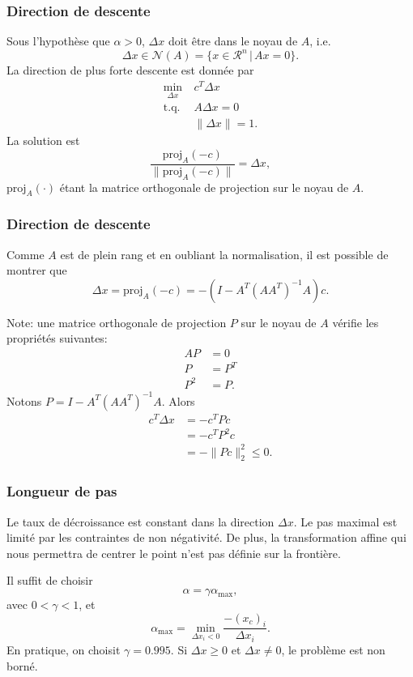 \documentclass[usepdftitle=false]{beamer}
\def\cN{\mathcal{N}}
\def\RR {\mathcal{R}}
\begin{document}
\begin{frame}
\frametitle{Direction de descente}

Sous l'hypothèse que $\alpha > 0$, $\Delta x$ doit être dans le noyau de $A$, i.e.
$$
\Delta x \in \cN(A) = \{x \in \RR^n \,|\, Ax = 0 \}.
$$
La direction de plus forte descente est donnée par
\begin{align*}
\min_{\Delta x}\ & c^T\Delta x \\
\mbox{t.q. } & A \Delta x = 0 \\
& \| \Delta x \| = 1.
\end{align*}
La solution est
$$
\frac{\text{proj}_A(-c)}{\| \text{proj}_A (-c) \|} = \Delta x,
$$
$\text{proj}_A(\cdot)$ étant la matrice orthogonale de projection sur le
noyau de $A$.

\end{frame}

\begin{frame}
\frametitle{Direction de descente}

Comme $A$ est de plein rang et en oubliant la normalisation, il est possible de montrer que
$$
\Delta x = \text{proj}_A(-c) = -(I - A^T(AA^T)^{-1}A)c.
$$

\mbox{}

Note: une matrice orthogonale de projection $P$ sur le noyau de $A$ vérifie les propriétés suivantes:
\begin{align*}
AP &= 0 \\
P &= P^T \\
P^2 &= P.
\end{align*}
Notons $P = I - A^T(AA^T)^{-1}A$. Alors
\begin{align*}
c^T \Delta x &= -c^T P c \\
& = -c^T P^2 c \\
& = - \| Pc \|^2_2 \leq 0.
\end{align*}

\end{frame}

\begin{frame}
\frametitle{Longueur de pas}

Le taux de décroissance est constant dans la direction $\Delta x$.
Le pas maximal est limité par les contraintes de non négativité.
De plus, la transformation affine qui nous permettra de centrer le point n'est pas définie sur la frontière.

\mbox{}

Il suffit de choisir
$$
\alpha = \gamma\alpha_{\max},
$$
avec $0 < \gamma < 1$, et
$$
\alpha_{\max} = \min_{\Delta x_i < 0} \frac{-(x_c)_i}{\Delta x_i}.
$$
En pratique, on choisit $\gamma  = 0.995$.
Si $\Delta x \geq 0$ et $\Delta x \ne 0$, le problème est non borné.

\end{frame}
\end{document}
